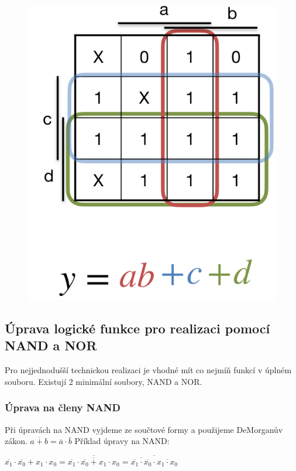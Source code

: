 \begin{figure}
    \centering
    \includegraphics[scale = 0.3]{img/minMapa.png}
\end{figure}

\subsection{Úprava logické funkce pro realizaci pomocí NAND a NOR}
Pro nejjednodušší technickou realizaci je vhodné mít co nejmíň funkcí v úplném souboru. Existují 2 minimální soubory, NAND a NOR.
\subsubsection*{Úprava na členy NAND}
Při úpravách na NAND vyjdeme ze součtové formy a použijeme DeMorganův zákon. \(\overline{a+b} = \overline{a} \cdot \overline{b}\)
Příklad úpravy na NAND:
\begin{center}
    \(\overline{x_1} \cdot \overline{x_0} + x_1 \cdot x_0 = \overline{\overline{\overline{x_1}\cdot\overline{x_0} + x_1 \cdot x_0}} = \overline{\overline{\overline{x_1}\cdot \overline{x_0}}\cdot\overline{x_1 \cdot x_0}}\)
\end{center}
